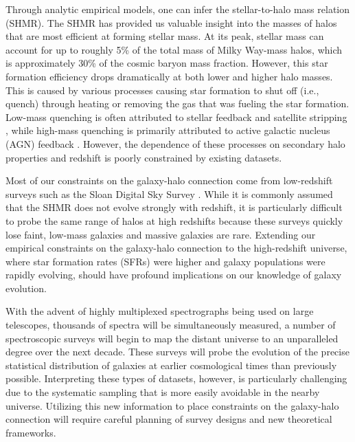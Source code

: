 \documentclass[twocolumn,twocolappendix]{aastex63}
\begin{document}
Through analytic empirical models, one can infer the stellar-to-halo mass relation (SHMR). The SHMR has provided us valuable insight into the masses of halos that are most efficient at forming stellar mass. At its peak, stellar mass can account for up to roughly 5\% of the total mass of Milky Way-mass halos, which is approximately 30\% of the cosmic baryon mass fraction. However, this star formation efficiency drops dramatically at both lower and higher halo masses. This is caused by various processes causing star formation to shut off (i.e., quench) through heating or removing the gas that was fueling the star formation. Low-mass quenching is often attributed to stellar feedback \citep{Fierlinger:2016} and satellite stripping \citep{Guo:2011}, while high-mass quenching is primarily attributed to active galactic nucleus (AGN) feedback \citep{Fabian:2012}. However, the dependence of these processes on secondary halo properties and redshift is poorly constrained by existing datasets.


Most of our constraints on the galaxy-halo connection come from low-redshift surveys such as the Sloan Digital Sky Survey \citep[SDSS;][]{Blanton:2017}. While it is commonly assumed that the SHMR does not evolve strongly with redshift, it is particularly difficult to probe the same range of halos at high redshifts because these surveys quickly lose faint, low-mass galaxies and massive galaxies are rare. Extending our empirical constraints on the galaxy-halo connection to the high-redshift universe, where star formation rates (SFRs) were higher and galaxy populations were rapidly evolving, should have profound implications on our knowledge of galaxy evolution. 


With the advent of highly multiplexed spectrographs being used on large telescopes, thousands of spectra will be simultaneously measured, a number of spectroscopic surveys will begin to map the distant universe to an unparalleled degree over the next decade. These surveys will probe the evolution of the precise statistical distribution of galaxies at earlier cosmological times than previously possible. Interpreting these types of datasets, however, is particularly challenging due to the systematic sampling that is more easily avoidable in the nearby universe. Utilizing this new information to place constraints on the galaxy-halo connection will require careful planning of survey designs and new theoretical frameworks.
\end{document}
